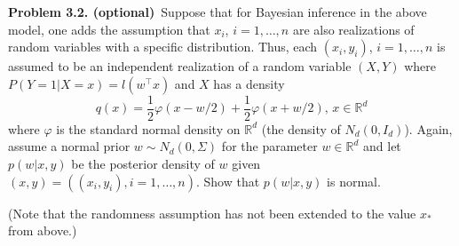 \documentclass[11pt,twoside]{article}%
\theoremstyle{change}
\begin{document}
\bigskip

\textbf{Problem 3.2. (optional)}\textit{\ }Suppose that for Bayesian inference
in the above model, one adds the assumption that $x_{i}$, $i=1,\ldots,n$ are
also realizations of random variables with a specific distribution. Thus, each
$\left(  x_{i},y_{i}\right)  $, $i=1,\ldots,n$ is assumed to be an independent
realization of a random variable $(X,Y)$ where $P\left(  Y=1|X=x\right)
=l\left(  w^{\top}x\right)  $ and $X$ has a density
\[
q(x)=\frac{1}{2}\varphi(x-w/2)+\frac{1}{2}\varphi(x+w/2)\text{, }%
x\in\mathbb{R}^{d}%
\]
where $\varphi$ is the standard normal density on $\mathbb{R}^{d}$ (the
density of $N_{d}(0,I_{d})$). Again, assume a normal prior $w\sim N_{d}\left(
0,\Sigma\right)  $ for the parameter $w\in\mathbb{R}^{d}$ and let $p\left(
w|x,y\right)  $ be the posterior density of $w$ given $\left(  x,y\right)
=\left(  \left(  x_{i},y_{i}\right)  ,i=1,\ldots,n\right)  .$ Show that
$p\left(  w|x,y\right)  $ is normal.

(Note that the randomness assumption has not been extended to the value
$x_{\ast}$ from above.)%
\end{document}
